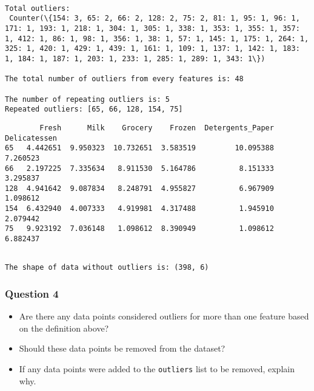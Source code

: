 \documentclass[11pt]{article}
\providecommand{\tightlist}{%
      \setlength{\itemsep}{0pt}\setlength{\parskip}{0pt}}
\begin{document}
    
    \begin{Verbatim}[commandchars=\\\{\}]

Total outliers:
 Counter(\{154: 3, 65: 2, 66: 2, 128: 2, 75: 2, 81: 1, 95: 1, 96: 1, 171: 1, 193: 1, 218: 1, 304: 1, 305: 1, 338: 1, 353: 1, 355: 1, 357: 1, 412: 1, 86: 1, 98: 1, 356: 1, 38: 1, 57: 1, 145: 1, 175: 1, 264: 1, 325: 1, 420: 1, 429: 1, 439: 1, 161: 1, 109: 1, 137: 1, 142: 1, 183: 1, 184: 1, 187: 1, 203: 1, 233: 1, 285: 1, 289: 1, 343: 1\})

The total number of outliers from every features is: 48

The number of repeating outliers is: 5
Repeated outliers: [65, 66, 128, 154, 75]

    \end{Verbatim}

    
    \begin{verbatim}
        Fresh      Milk    Grocery    Frozen  Detergents_Paper  Delicatessen
65   4.442651  9.950323  10.732651  3.583519         10.095388      7.260523
66   2.197225  7.335634   8.911530  5.164786          8.151333      3.295837
128  4.941642  9.087834   8.248791  4.955827          6.967909      1.098612
154  6.432940  4.007333   4.919981  4.317488          1.945910      2.079442
75   9.923192  7.036148   1.098612  8.390949          1.098612      6.882437
    \end{verbatim}

    
    \begin{Verbatim}[commandchars=\\\{\}]

The shape of data without outliers is: (398, 6)

    \end{Verbatim}

    \hypertarget{question-4}{%
\subsubsection{Question 4}\label{question-4}}

\begin{itemize}
\tightlist
\item
  Are there any data points considered outliers for more than one
  feature based on the definition above?
\item
  Should these data points be removed from the dataset?
\item
  If any data points were added to the \texttt{outliers} list to be
  removed, explain why.
\end{itemize}
\end{document}
